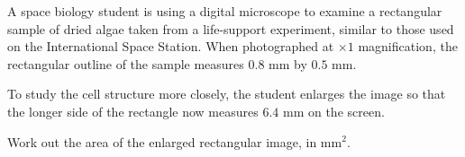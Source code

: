 \begin{question}
\noindent A space biology student is using a digital microscope to examine a rectangular sample of dried algae taken from a life-support experiment, similar to those used on the International Space Station. When photographed at $\times 1$ magnification, the rectangular outline of the sample measures $0.8$ mm by $0.5$ mm.

\noindent To study the cell structure more closely, the student enlarges the image so that the longer side of the rectangle now measures $6.4$ mm on the screen.

\vspace{0.3cm}
\noindent Work out the area of the enlarged rectangular image, in mm$^2$.

\vspace{4cm}

\begin{flushright}
\end{flushright}
\end{question}
